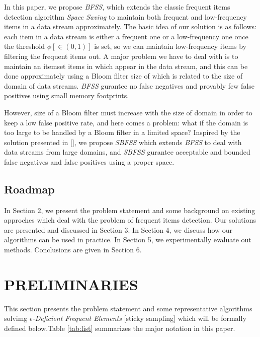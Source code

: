 \documentclass[conference]{IEEEtran}
\begin{document}
In this paper, we propose \emph{BFSS}, which extends the classic frequent items detection algorithm \emph{Space Saving} to maintain both frequent and low-frequency items in a data stream approximately. The basic idea of our solution is as follows: each item in a data stream is either a frequent one or a low-frequency one once the threshold $\phi[\in (0,1)]$ is set, so we can maintain low-frequency items by filtering the frequent items out. A major problem we have to deal with is to maintain an itemset items in which appear in the data stream, and this can be done approximately using a Bloom filter size of which is related to the size of domain of data streams. \emph{BFSS} gurantee no false negatives and provably few false positives using small memory footprints.\par

However, size of a Bloom filter must increase with the size of domain in order to keep a low false positive rate, and here comes a problem: what if the domain is too large to be handled by a Bloom filter in a limited space? Inspired by the solution presented in [], we propose \emph{SBFSS} which extends \emph{BFSS} to deal with data streams from large domains, and \emph{SBFSS} gurantee acceptable and bounded false negatives and false positives using a proper space.

\subsection{Roadmap}
In Section 2, we present the problem statement and some background on existing approches which deal with the problem of frequent items detection. Our solutions are presented and discussed in Section 3. In Section 4, we discuss how our algorithms can be used in practice. In Section 5, we experimentally evaluate out methods. Conclusions are given in Section 6.

\section{PRELIMINARIES}
This section presents the problem statement and some representative algorithms solvimg $\epsilon$\emph{-Deficient Frequent Elements} [sticky sampling] which will be formally defined below.Table \ref{tab:list} summarizes the major notation in this paper.
\end{document}
